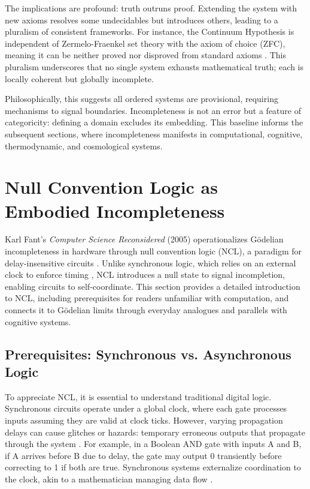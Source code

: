 \documentclass{article}
\begin{document}
The implications are profound: truth outruns proof. Extending the system with new axioms resolves some undecidables but introduces others, leading to a pluralism of consistent frameworks. For instance, the Continuum Hypothesis is independent of Zermelo-Fraenkel set theory with the axiom of choice (ZFC), meaning it can be neither proved nor disproved from standard axioms \citep{godel1931}. This pluralism underscores that no single system exhausts mathematical truth; each is locally coherent but globally incomplete.

Philosophically, this suggests all ordered systems are provisional, requiring mechanisms to signal boundaries. Incompleteness is not an error but a feature of categoricity: defining a domain excludes its embedding. This baseline informs the subsequent sections, where incompleteness manifests in computational, cognitive, thermodynamic, and cosmological systems.

\section{Null Convention Logic as Embodied Incompleteness}
\label{sec:ncl}
Karl Fant's \textit{Computer Science Reconsidered} (2005) operationalizes G\"{o}delian incompleteness in hardware through null convention logic (NCL), a paradigm for delay-insensitive circuits \citep{fant2005}. Unlike synchronous logic, which relies on an external clock to enforce timing \citep{seitz1980}, NCL introduces a null state to signal incompletion, enabling circuits to self-coordinate. This section provides a detailed introduction to NCL, including prerequisites for readers unfamiliar with computation, and connects it to G\"{o}delian limits through everyday analogues and parallels with cognitive systems.

\subsection{Prerequisites: Synchronous vs. Asynchronous Logic}
To appreciate NCL, it is essential to understand traditional digital logic. Synchronous circuits operate under a global clock, where each gate processes inputs assuming they are valid at clock ticks. However, varying propagation delays can cause glitches or hazards: temporary erroneous outputs that propagate through the system \citep{seitz1980}. For example, in a Boolean AND gate with inputs A and B, if A arrives before B due to delay, the gate may output 0 transiently before correcting to 1 if both are true. Synchronous systems externalize coordination to the clock, akin to a mathematician managing data flow \citep{fant2005}.
\end{document}
